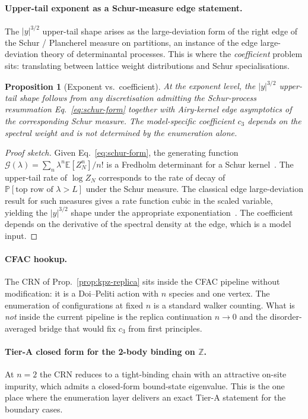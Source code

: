 \documentclass[10pt,a4paper,twocolumn]{article}
\theoremstyle{plain}
\newtheorem{proposition}[theorem]{Proposition}
\theoremstyle{definition}
\newcommand{\Ex}{\mathbb{E}}
\begin{document}
\paragraph{Upper-tail exponent as a Schur-measure edge statement.}
The $|y|^{3/2}$ upper-tail shape arises as the large-deviation form
of the right edge of the Schur / Plancherel measure on partitions,
an instance of the edge large-deviation theory of determinantal
processes.  This is where the \emph{coefficient} problem sits:
translating between lattice weight distributions and Schur specialisations.

\begin{proposition}[Exponent vs.\ coefficient]
\label{prop:kpz-exponent-coeff}
At the exponent level, the $|y|^{3/2}$ upper-tail shape follows from
any discretisation admitting the Schur-process resummation
Eq.~\eqref{eq:schur-form} together with Airy-kernel edge asymptotics
of the corresponding Schur measure.  The model-specific coefficient
$c_3$ depends on the spectral weight and is not determined by the
enumeration alone.
\end{proposition}

\begin{proof}[Proof sketch]
Given Eq.~\eqref{eq:schur-form}, the generating function
$\mathcal{G}(\lambda) = \sum_n \lambda^n \Ex[Z_N^n] / n!$ is a
Fredholm determinant for a Schur kernel~\citep{BorodinCorwin2014}.
The upper-tail rate of $\log Z_N$ corresponds to the rate of decay
of $\mathbb{P}[\text{top row of }\lambda > L]$ under the Schur
measure.  The classical edge large-deviation result for such measures
gives a rate function cubic in the scaled variable, yielding the
$|y|^{3/2}$ shape under the appropriate exponentiation~\citep{Krajenbrink}.
The coefficient depends on the derivative of the spectral density at
the edge, which is a model input.
\end{proof}

\paragraph{CFAC hookup.}  The CRN of Prop.~\ref{prop:kpz-replica}
sits inside the CFAC pipeline without modification: it is a Doi--Peliti
action with $n$ species and one vertex.  The enumeration of
configurations at fixed $n$ is a standard walker counting.  What is
\emph{not} inside the current pipeline is the replica continuation
$n \to 0$ and the disorder-averaged bridge that would fix $c_3$ from
first principles.

\paragraph{Tier-A closed form for the 2-body binding on
$\boldsymbol{\mathbb{Z}}$.}
At $n = 2$ the CRN reduces to a tight-binding chain with an
attractive on-site impurity, which admits a closed-form bound-state
eigenvalue.  This is the one place where the enumeration layer
delivers an exact Tier-A statement for the boundary cases.
\end{document}
